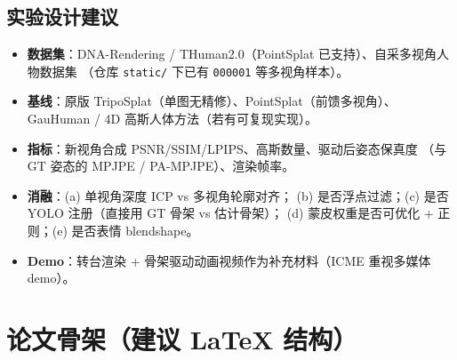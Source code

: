\documentclass[11pt]{article}
\begin{document}
\subsection{实验设计建议}
\begin{itemize}[leftmargin=1.4em]
  \item \textbf{数据集}：DNA-Rendering / THuman2.0（PointSplat 已支持）、自采多视角人物数据集
        （仓库 \texttt{static/} 下已有 \texttt{000001} 等多视角样本）。
  \item \textbf{基线}：原版 TripoSplat（单图无精修）、PointSplat（前馈多视角）、
        GauHuman / 4D 高斯人体方法（若有可复现实现）。
  \item \textbf{指标}：新视角合成 PSNR/SSIM/LPIPS、高斯数量、驱动后姿态保真度
        （与 GT 姿态的 MPJPE / PA-MPJPE）、渲染帧率。
  \item \textbf{消融}：(a) 单视角深度 ICP vs 多视角轮廓对齐；
        (b) 是否浮点过滤；(c) 是否 YOLO 注册（直接用 GT 骨架 vs 估计骨架）；
        (d) 蒙皮权重是否可优化 + 正则；(e) 是否表情 blendshape。
  \item \textbf{Demo}：转台渲染 + 骨架驱动动画视频作为补充材料（ICME 重视多媒体 demo）。
\end{itemize}

\section{论文骨架（建议 LaTeX 结构）}
\end{document}
